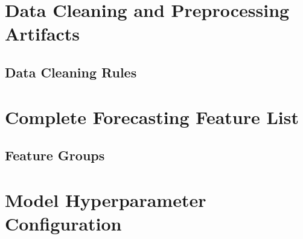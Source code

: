 \appendix

\chapter{Data Cleaning and Preprocessing Artifacts}
\section{Data Cleaning Rules}
\begin{table}[H]
\centering
\caption{Summary of data cleaning and preprocessing rules}
\label{tab:appendix_a_cleaning_rules}
\end{table}

\chapter{Complete Forecasting Feature List}
\section{Feature Groups}
\begin{table}[H]
\centering
\caption{Complete forecasting feature groups}
\label{tab:appendix_b_feature_groups}
\end{table}

\chapter{Model Hyperparameter Configuration}
\begin{table}[H]
\centering
\caption{Hyperparameter configuration for RBFNN, Random Forest, and XGBoost models}
\label{tab:appendix_c_model_hyperparameters}
\end{table}

